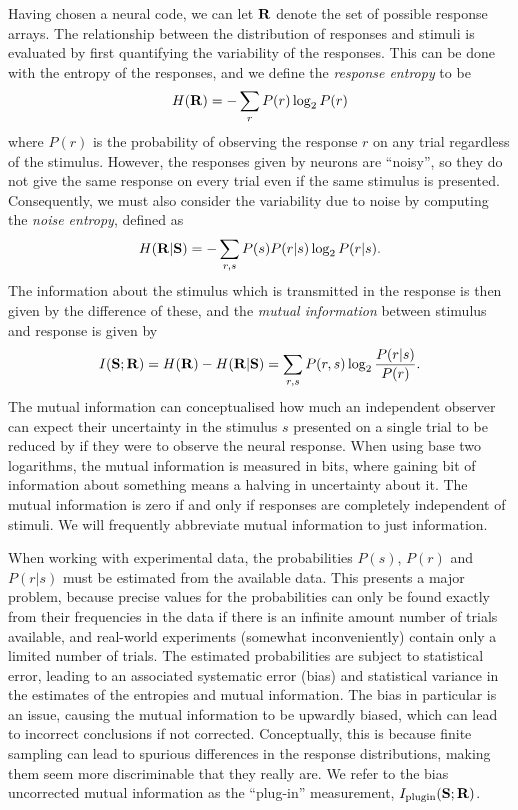 Having chosen a neural code, we can let $\mathbf{R}$ denote the set of possible response arrays.
The relationship between the distribution of responses and stimuli is evaluated by first quantifying the variability of the responses.
This can be done with the entropy \cite{Shannon1948} of the responses, and we define the \textit{response entropy} to be
\begin{equation}
H( \mathbf{R} )
= - \sum_{r} P(r) \log_2 P(r)
\end{equation}
where $P(r)$ is the probability of observing the response $r$ on any trial regardless of the stimulus.
However, the responses given by neurons are ``noisy'', so they do not give the same response on every trial even if the same stimulus is presented.
Consequently, we must also consider the variability due to noise by computing the \textit{noise entropy}, defined as
\begin{equation}
H( \mathbf{R} | \mathbf{S} )
= - \sum_{r,s} P(s) P(r|s) \log_2 P(r|s)
.\end{equation}
The information about the stimulus which is transmitted in the response is then given by the difference of these, and the \textit{mutual information} between stimulus and response is given by
\begin{equation}
I( \mathbf{S} ; \mathbf{R} )
= H( \mathbf{R} ) - H( \mathbf{R} | \mathbf{S} )
= \sum_{r,s} P(r,s) \log_2 \frac{P(r|s)}{P(r)}
.\end{equation}
The mutual information can conceptualised how much an independent observer can expect their uncertainty in the stimulus $s$ presented on a single trial to be reduced by if they were to observe the neural response.
When using base two logarithms, the mutual information is measured in bits, where gaining \unit[1]{bit} of information about something means a halving in uncertainty about it.
The mutual information is zero if and only if responses are completely independent of stimuli.
We will frequently abbreviate mutual information to just information.

When working with experimental data, the probabilities $P(s)$, $P(r)$ and $P(r|s)$ must be estimated from the available data.
This presents a major problem, because precise values for the probabilities can only be found exactly from their frequencies in the data if there is an infinite amount number of trials available, and real-world experiments (somewhat inconveniently) contain only a limited number of trials.
The estimated probabilities are subject to statistical error, leading to an associated systematic error (bias) and statistical variance in the estimates of the entropies and mutual information.
The bias in particular is an issue, causing the mutual information to be upwardly biased, which can lead to incorrect conclusions if not corrected.
Conceptually, this is because finite sampling can lead to spurious differences in the response distributions, making them seem more discriminable that they really are.
We refer to the bias uncorrected mutual information as the ``plug-in'' measurement, $I_{\text{plugin}}(\mathbf{S};\mathbf{R})$.

